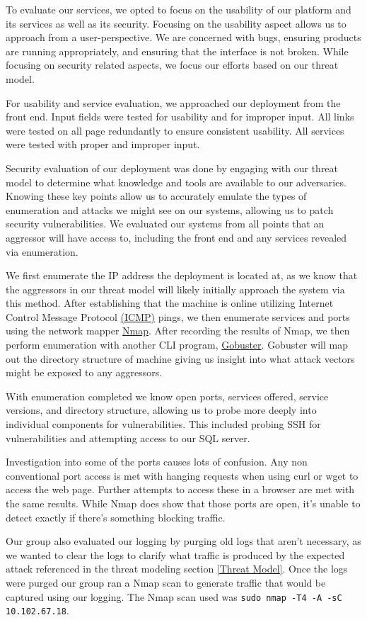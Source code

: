 To evaluate our services, we opted to focus on the usability of our platform and its services as well as its security.
Focusing on the usability aspect allows us to approach from a user-perspective. We are concerned with bugs,
ensuring products are running appropriately, and ensuring that the interface is not broken. While focusing
on security related aspects, we focus our efforts based on our threat model.

For usability and service evaluation, we approached our deployment from the front end. Input fields were
tested for usability and for improper input. All links were tested on all page redundantly to ensure consistent
usability. All services were tested with proper and improper input.

Security evaluation of our deployment was done by engaging with our threat model to determine what knowledge
and tools are available to our adversaries. Knowing these key points allow us to accurately emulate the
types of enumeration and attacks we might see on our systems, allowing us to patch security vulnerabilities.
We evaluated our systems from all points that an aggressor will have access to, including the front end and
any services revealed via enumeration.

We first enumerate the IP address the deployment is located at, as we know that the aggressors in our threat
model will likely initially approach the system via this method. After establishing that the machine is online
utilizing Internet Control Message Protocol \hyperlink{https://datatracker.ietf.org/doc/html/rfc792}{(ICMP)} pings,
we then enumerate services and ports using the network mapper \hyperlink{https://nmap.org/}{Nmap}. After recording
the results of Nmap, we then perform enumeration with another CLI program, \hyperlink{https://github.com/OJ/gobuster}{Gobuster}.
Gobuster will map out the directory structure of machine giving us insight into what attack vectors might be exposed
to any aggressors.

With enumeration completed we know open ports, services offered, service versions, and directory structure, allowing
us to probe more deeply into individual components for vulnerabilities. This included probing SSH for vulnerabilities
and attempting access to our SQL server.

Investigation into some of the ports causes lots of confusion. Any non conventional port access is met with hanging requests when using curl or wget to access the web page. Further attempts to access these in a browser are met with the same results. While Nmap does show that those ports are open, it’s unable to detect exactly if there’s something blocking traffic. 

Our group also evaluated our logging by purging old logs that aren't necessary, as we wanted to clear the logs to clarify what traffic is produced by the expected attack referenced in the threat modeling section \ref{Threat Model}. Once the logs were purged our group ran a Nmap scan to generate traffic that would be captured using our logging. The Nmap scan used was \texttt{sudo nmap -T4 -A -sC 10.102.67.18}.



